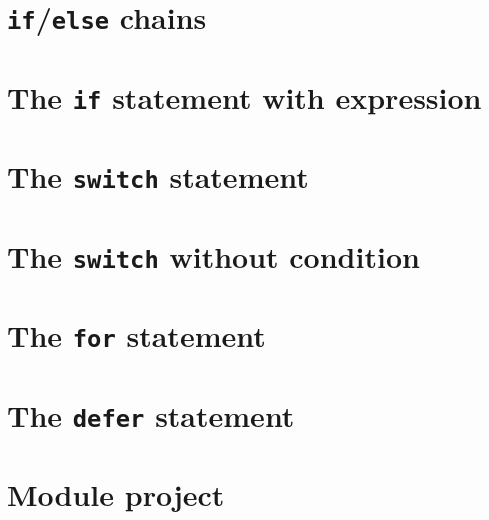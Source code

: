 \documentclass[]{book}
\begin{document}
\hypertarget{ifelse-chains}{%
\section{\texorpdfstring{\texttt{if}/\texttt{else} chains}{if/else chains}}\label{ifelse-chains}}

\hypertarget{the-if-statement-with-expression}{%
\section{\texorpdfstring{The \texttt{if} statement with expression}{The if statement with expression}}\label{the-if-statement-with-expression}}

\hypertarget{the-switch-statement}{%
\section{\texorpdfstring{The \texttt{switch} statement}{The switch statement}}\label{the-switch-statement}}

\hypertarget{the-switch-without-condition}{%
\section{\texorpdfstring{The \texttt{switch} without condition}{The switch without condition}}\label{the-switch-without-condition}}

\hypertarget{the-for-statement}{%
\section{\texorpdfstring{The \texttt{for} statement}{The for statement}}\label{the-for-statement}}

\hypertarget{the-defer-statement}{%
\section{\texorpdfstring{The \texttt{defer} statement}{The defer statement}}\label{the-defer-statement}}

\hypertarget{module-project-1}{%
\section*{Module project}\label{module-project-1}}
\end{document}
